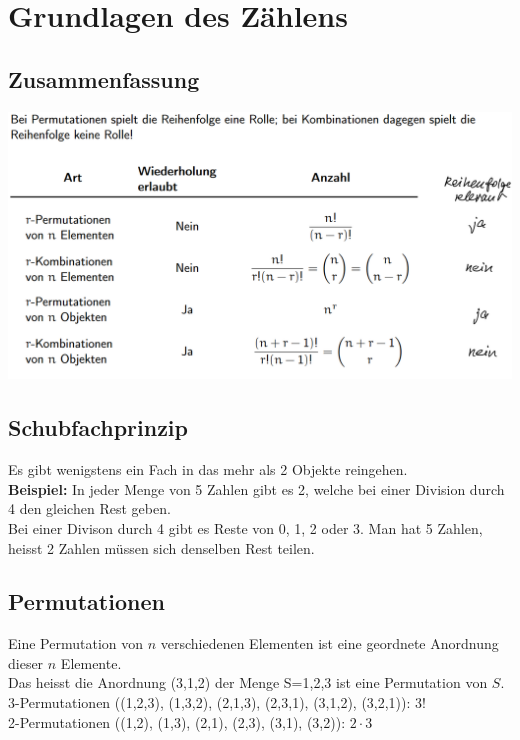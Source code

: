 \documentclass[12pt]{scrartcl}
\begin{document}
\section{Grundlagen des Zählens}
\subsection{Zusammenfassung}
\includegraphics[width=15cm]{img/wahrscheinlichkeiten.png}


\subsection{Schubfachprinzip}
Es gibt wenigstens ein Fach in das mehr als 2 Objekte reingehen.\\

\textbf{Beispiel:} In jeder Menge von 5 Zahlen gibt es 2, welche bei einer
Division durch 4 den gleichen Rest geben.\\
Bei einer Divison durch 4 gibt es Reste von 0, 1, 2 oder 3. Man hat 5 Zahlen, heisst
2 Zahlen müssen sich denselben Rest teilen.\\


\subsection{Permutationen}
Eine Permutation von $n$ verschiedenen Elementen ist eine geordnete Anordnung dieser $n$ Elemente.\\
Das heisst die Anordnung (3,1,2) der Menge S={1,2,3} ist eine Permutation von $S$.\\
3-Permutationen ((1,2,3), (1,3,2), (2,1,3), (2,3,1), (3,1,2), (3,2,1)): 3!\\
2-Permutationen ((1,2), (1,3), (2,1), (2,3), (3,1), (3,2)): $2 \cdot 3$\\
\end{document}
